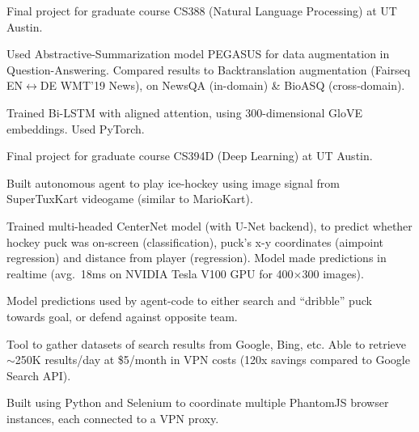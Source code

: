 \documentclass[]{deedy-resume-openfont}
\begin{document}


\subsubsectionsep
Final project for graduate course CS388 (Natural Language Processing) at UT Austin.
\begin{tightemize}
    \item Used Abstractive-Summarization model PEGASUS for data augmentation in Question-Answering. Compared results to Backtranslation augmentation (Fairseq EN$\leftrightarrow$DE WMT'19 News), on NewsQA (in-domain) \& BioASQ (cross-domain).
    \item Trained Bi-LSTM with aligned attention, using 300-dimensional GloVE embeddings. Used PyTorch.
\end{tightemize}
\sectionsep

Final project for graduate course CS394D (Deep Learning) at UT Austin.
\begin{tightemize}
    \item Built autonomous agent to play ice-hockey using image signal from SuperTuxKart videogame (similar to MarioKart). 
    \item Trained multi-headed CenterNet model (with U-Net backend), to predict whether hockey puck was on-screen (classification), puck's x-y coordinates (aimpoint regression) and distance from player (regression). Model made predictions in realtime \mbox{(avg. 18ms} on NVIDIA Tesla V100 GPU for 400$\times$300 images).
    \item Model predictions used by agent-code to either search and ``dribble'' puck towards goal, or defend against opposite team.
\end{tightemize}
\sectionsep


\begin{tightemize}
    \item Tool to gather datasets of search results from Google, Bing, etc. Able to retrieve $\sim$250K results/day at \$5/month in VPN costs (120x savings compared to Google Search API).
    \item Built using Python and Selenium to coordinate multiple PhantomJS browser instances, each connected to a VPN proxy.
\end{tightemize}
\end{document}
